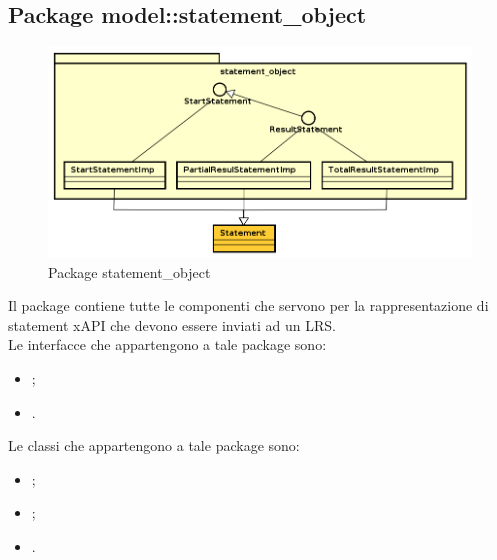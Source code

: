 \documentclass[../Tesi.tex]{subfiles}
\begin{document}
	\subsection{Package model::statement\_object}
		\begin{figure}[H]
			\centering
			\includegraphics[scale=0.6]{images/package_diagrams/statement_object}
				\caption{Package statement\_object}
		\end{figure}
		Il package  contiene tutte le componenti che servono per la rappresentazione di statement xAPI che devono essere inviati ad un LRS.\\
		Le interfacce che appartengono a tale package sono:
		\begin{itemize}
			\item {};
			\item {}.
		\end{itemize}
		Le classi che appartengono a tale package sono:
		\begin{itemize}
			\item {};
			\item {};
			\item {}.
		\end{itemize}
\end{document}
